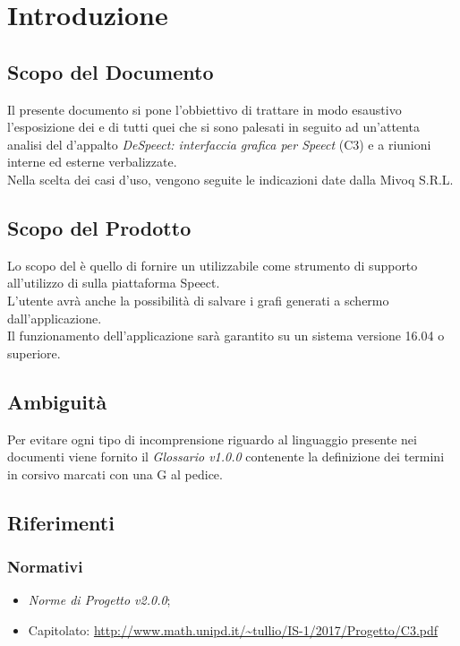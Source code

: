 \documentclass[./AnalisideiRequisiti.tex]{subfiles}
\begin{document}
	
\chapter{Introduzione}
\section{Scopo del Documento}
Il presente documento si pone l’obbiettivo di trattare in modo esaustivo l’esposizione dei  e di tutti quei  che si sono palesati in seguito ad un’attenta analisi del  d’appalto \textit{DeSpeect: interfaccia grafica per Speect} (C3) e a riunioni interne ed esterne verbalizzate.
\\ \noindent Nella scelta dei casi d'uso, vengono seguite le indicazioni date dalla  Mivoq S.R.L.

\section{Scopo del Prodotto}

Lo scopo del  è quello di fornire un  utilizzabile come strumento di supporto all'utilizzo di  sulla piattaforma Speect. 
\\ \noindent L'utente avrà anche la possibilità di salvare i grafi generati a schermo dall'applicazione.
\\ \noindent Il funzionamento dell'applicazione sarà garantito su un sistema  versione 16.04 o superiore.

\section{Ambiguità}
Per evitare ogni tipo di incomprensione riguardo al linguaggio presente nei documenti viene fornito il \textit{Glossario v1.0.0} contenente la definizione dei termini in corsivo marcati con una G al pedice.

\section{Riferimenti}
\subsection*{Normativi}
\begin{itemize}
	\item \textit{Norme di Progetto v2.0.0};
	\item Capitolato: \url{http://www.math.unipd.it/~tullio/IS-1/2017/Progetto/C3.pdf}
\end{itemize}
\end{document}
